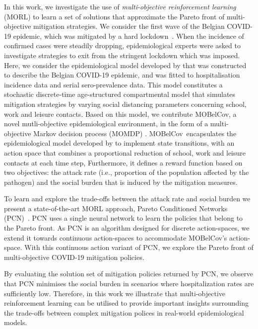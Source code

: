 \documentclass{article}
\renewcommand{\cite}[1]{\citep{#1}}
\newcommand{\momdpname}{MOBelCov}
\begin{document}
In this work, we investigate the use of \emph{multi-objective reinforcement learning} (MORL) to learn a set of solutions that approximate the Pareto front of multi-objective mitigation strategies. We consider the first wave of the Belgian COVID-19 epidemic, which was mitigated by a hard lockdown~\cite{willem2021impact}. When the incidence of confirmed cases were steadily dropping, epidemiological experts were asked to investigate strategies to exit from the stringent lockdown which was imposed.
Here, we consider the epidemiological model developed by \citet{abrams2021modelling} that was constructed to describe the Belgian COVID-19 epidemic, and was fitted to hospitalisation incidence data and serial sero-prevalence data.
This model constitutes a stochastic discrete-time age-structured compartmental model that simulates mitigation strategies by varying social distancing parameters concerning school, work and leisure contacts.  
Based on this model, we contribute \momdpname, a novel mutli-objective epidemiological environment, in the form of a multi-objective Markov decision process (MOMDP) \cite{roijers2013survey}. \momdpname\ encapsulates the epidemiological model developed by \citet{abrams2021modelling} to implement state transitions, with an action space that combines a proportional reduction of school, work and leisure contacts at each time step, Furthermore, it defines a reward function based on two objectives: the attack rate (i.e., proportion of the population affected by the pathogen) and the social burden that is induced by the mitigation measures.

To learn and explore the trade-offs between the attack rate and social burden we present a state-of-the-art MORL approach, Pareto Conditioned Networks (PCN)~\cite{reymond2022pcn}. PCN uses a single neural network to learn the policies that belong to the Pareto front.
As PCN is an algorithm designed for discrete action-spaces, we extend it towards continuous action-spaces to accommodate \momdpname's action-space. With this continuous action variant of PCN, we explore the Pareto front of multi-objective COVID-19 mitigation policies.  

By evaluating the solution set of mitigation policies returned by PCN, we observe that PCN minimises the social burden in scenarios where hospitalization rates are sufficiently low. Therefore, in this work we illustrate that multi-objective reinforcement learning can be utilised to provide important insights surrounding the trade-offs between complex mitigation polices in real-world epidemiological models.
\end{document}

